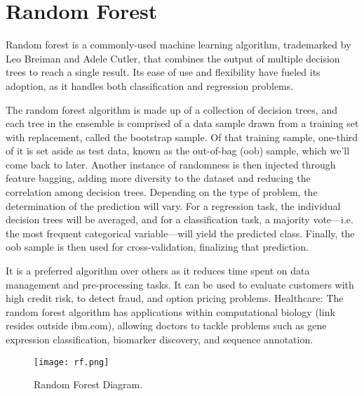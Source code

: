 \documentclass[12pt,a4paper]{report}
\begin{document}
\chapter{Random Forest}
Random forest is a commonly-used machine learning algorithm, trademarked by Leo Breiman and Adele Cutler, that combines the output of multiple decision trees to reach a single result. Its ease of use and flexibility have fueled its adoption, as it handles both classification and regression problems.\par
The random forest algorithm is made up of a collection of decision trees, and each tree in the ensemble is comprised of a data sample drawn from a training set with replacement, called the bootstrap sample. Of that training sample, one-third of it is set aside as test data, known as the out-of-bag (oob) sample, which we’ll come back to later. Another instance of randomness is then injected through feature bagging, adding more diversity to the dataset and reducing the correlation among decision trees. Depending on the type of problem, the determination of the prediction will vary. For a regression task, the individual decision trees will be averaged, and for a classification task, a majority vote—i.e. the most frequent categorical variable—will yield the predicted class. Finally, the oob sample is then used for cross-validation, finalizing that prediction. \par
It is a preferred algorithm over others as it reduces time spent on data management and pre-processing tasks. It can be used to evaluate customers with high credit risk, to detect fraud, and option pricing problems. Healthcare: The random forest algorithm has applications within computational biology (link resides outside ibm.com), allowing doctors to tackle problems such as gene expression classification, biomarker discovery, and sequence annotation. 

\begin{figure}
  \centering
\texttt{[image: rf.png]}
  \caption{Random Forest Diagram.}
\end{figure}
\end{document}
